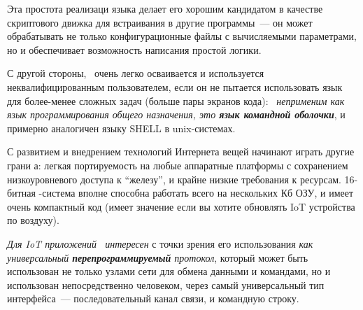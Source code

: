 Эта простота реализаци языка делает его хорошим кандидатом в качестве
скриптового движка для встраивания в другие программы\ --- он может обрабатывать
не только конфигурационные файлы с вычисляемыми параметрами, но и обеспечивает
возможность написания простой логики.

С другой стороны, \F\ очень легко осваивается и используется неквалифицированным
пользователем, если он не пытается использовать язык для более-менее сложных
задач (больше пары экранов кода): \emph{\F\ неприменим как язык программирования
общего назначения, это \textbf{язык командной оболочки}}, и примерно аналогичен
языку SHELL в unix-системах.

\clearpage
С развитием и внедрением технологий Интернета вещей начинают играть другие грани
\F а: легкая портируемость на любые аппаратные платформы с сохранением
низкоуровневого доступа к ``железу'', и крайне низкие требования к ресурсам.
16-битная \F-система вполне способна работать всего на нескольких Кб ОЗУ, и
имеет очень компактный код (имеет значение если вы хотите обновлять IoT
устройства по воздуху).

\emph{Для IoT приложений \F\ интересен} с точки зрения его использования
\emph{как универсальный \textbf{перепрограммируемый} протокол}, который может
быть использован не только узлами сети для обмена данными и командами, но и
использован непосредственно человеком, через самый универсальный тип интерфейса\
--- последовательный канал связи, и командную строку.


